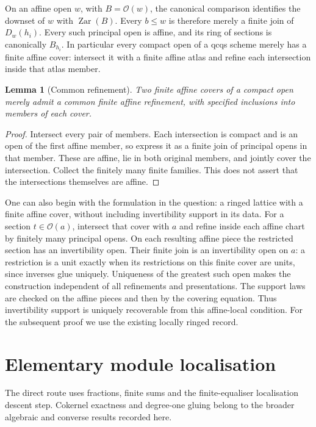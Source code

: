 \documentclass[11pt]{amsart}
\newtheorem{lemma}[theorem]{Lemma}
\theoremstyle{definition}\newtheorem{definition}[theorem]{Definition}
\theoremstyle{remark}\newtheorem{remark}[theorem]{Remark}
\newcommand{\OO}{\mathcal O}
\begin{document}
On an affine open $w$, with $B=\OO(w)$, the canonical comparison
identifies the downset of $w$ with $\operatorname{Zar}(B)$. Every
$b\le w$ is therefore merely a finite join of $D_w(h_i)$.
Every such principal open is affine, and its ring of sections is
canonically $B_{h_i}$. In particular every compact open of a qcqs
scheme merely has a finite affine cover: intersect it with a finite
affine atlas and refine each intersection inside that atlas member.

\begin{lemma}[Common refinement]\label{lem:refine}
Two finite affine covers of a compact open merely admit a common
finite affine refinement, with specified inclusions into members of
each cover.
\end{lemma}
\begin{proof}
Intersect every pair of members. Each intersection is compact and is
an open of the first affine member, so express it as a finite join of
principal opens in that member. These are affine, lie in both original
members, and jointly cover the intersection. Collect the finitely many
finite families. This does not assert that the intersections themselves
are affine.
\end{proof}

One can also begin with the formulation in the question: a ringed
lattice with a finite affine cover, without including invertibility
support in its data. For a section $t\in\OO(a)$, intersect that cover
with $a$ and refine inside each affine chart by finitely many principal
opens. On each resulting affine piece the restricted section has an
invertibility open. Their finite join is an invertibility open on
$a$: a restriction is a unit exactly when its restrictions on this
finite cover are units, since inverses glue uniquely. Uniqueness of
the greatest such open makes the construction independent of all
refinements and presentations. The support laws are checked on the
affine pieces and then by the covering equation. Thus invertibility
support is uniquely recoverable from this affine-local condition.
For the subsequent proof we use the existing locally ringed record.

\section{Elementary module localisation}\label{sec:algebra}
The direct route uses fractions, finite sums and the finite-equaliser
localisation descent step. Cokernel exactness and degree-one gluing
belong to the broader algebraic and converse results recorded here.
\end{document}
